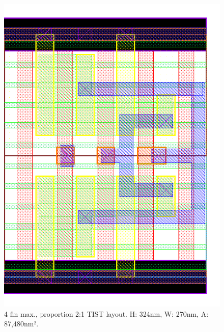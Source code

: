 \documentclass[pgmicro,diss,english]{iiufrgs}
\begin{document}
\begin{figure}[]
\centering
\includegraphics[width=\textwidth,height=\textheight,keepaspectratio]{TIST4F2F.png}
\caption{4 fin max., proportion 2:1 TIST layout. H: 324nm, W: 270nm, A: 87,480nm².}
\label{fig:TIST3F}
\end{figure}
\end{document}
